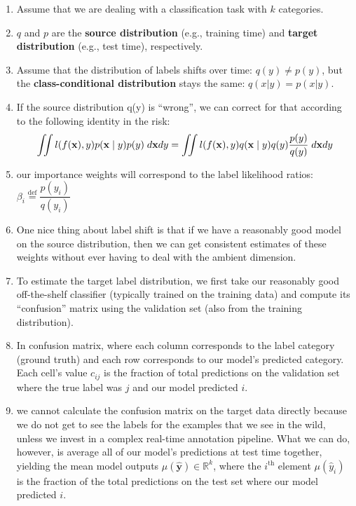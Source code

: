 \begin{enumerate}[itemsep=0.2cm]
    \item Assume that we are dealing with a classification task with $k$ categories.

    \item $q$ and $p$ are the \textbf{source distribution} (e.g., training time) and \textbf{target distribution} (e.g., test time), respectively.

    \item Assume that the distribution of labels shifts over time: $q(y) \neq p(y)$, but the \textbf{class-conditional distribution} stays the same: $q(x | y) = p(x | y)$.

    \item If the source distribution q(y) is “wrong”, we can correct for that according to the following identity in the risk:
    \[
        \hfill
        \iint l(f(\mathbf{x}), y) p(\mathbf{x} \mid y)p(y) \;d\mathbf{x}dy =
        \iint l(f(\mathbf{x}), y) q(\mathbf{x} \mid y)q(y)\dfrac{p(y)}{q(y)} \;d\mathbf{x}dy
        \hfill
    \]

    \item our importance weights will correspond to the label likelihood ratios: $\beta_i \stackrel{\textrm{def}}{=} \dfrac{p(y_i)}{q(y_i)}$

    \item One nice thing about label shift is that if we have a reasonably good model on the source distribution, then we can get consistent estimates of these weights without ever having to deal with the ambient dimension.

    \item To estimate the target label distribution, we first take our reasonably good off-the-shelf classifier (typically trained on the training data) and compute its “confusion” matrix using the validation set (also from the training distribution).

    \item In confusion matrix, where each column corresponds to the label category (ground truth) and each row corresponds to our model’s predicted category. Each cell’s value $c_{ij}$ is the fraction of total predictions on the validation set where the true label was $j$ and our model predicted $i$.

    \item we cannot calculate the confusion matrix on the target data directly because we do not get to see the labels for the examples that we see in the wild, unless we invest in a complex real-time annotation pipeline. What we can do, however, is average all of our model’s predictions at test time together, yielding the mean model outputs $\mu(\hat{\mathbf{y}}) \in \mathbb{R}^k$, where the $i^\textrm{th}$ element $\mu(\hat{y}_i)$ is the fraction of the total predictions on the test set where our model predicted $i$.


\end{enumerate}
